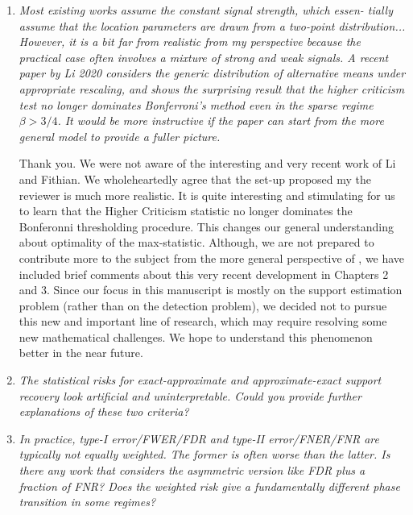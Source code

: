 \documentclass[11pt]{article}
\begin{document}
   \begin{enumerate}
    \item {\em Most existing works assume the constant signal strength, which essen- tially assume that the location parameters are drawn from a two-point distribution... However, it is a bit far from realistic from my perspective because the practical case often involves a mixture of strong and weak signals. A recent paper by Li 2020 considers the generic distribution of alternative means under appropriate rescaling, and shows the surprising result that the higher criticism test no longer dominates Bonferroni’s method even in the sparse regime $\beta >3/4$. It would be more instructive if the paper can start from the more general model to provide a fuller picture.}
    
    \medskip
    Thank you.  We were not aware of the interesting and very recent work \cite{li2020optimality}
     of Li and Fithian. We wholeheartedly agree that the set-up proposed my the reviewer is much more realistic.  
     It is quite interesting and stimulating for us to learn that the Higher Criticism statistic no longer dominates the Bonferonni thresholding procedure.  
     This changes our general understanding about optimality of the max-statistic.  Although, we are not prepared to contribute more to the subject from 
     the more general perspective of  \cite{li2020optimality}, we have included brief comments about this very recent development in Chapters 2 and 3.  
     Since our focus in this manuscript is mostly on the support estimation problem (rather than on the detection problem), we decided not to pursue 
     this new and important line of research, which may require resolving some new mathematical challenges. We hope to understand this phenomenon 
     better in the near future.
     
     
    \item {\em The statistical risks for exact-approximate and approximate-exact support recovery look artificial and uninterpretable. 
    Could you provide further explanations of these two criteria?} 
    
        
        \item {\em In practice, type-I error/FWER/FDR and type-II error/FNER/FNR are typically not equally weighted. The former is often worse than the latter. Is there any work that considers the asymmetric version like FDR plus a fraction of FNR? Does the weighted risk give a fundamentally different phase transition in some regimes?}
        

\end{enumerate}
\end{document}
